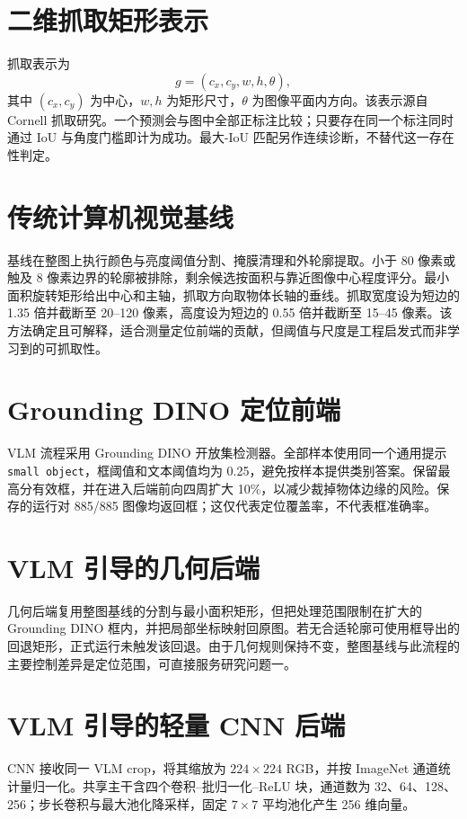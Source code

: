 \documentclass{l4proj}
\begin{document}
\section{二维抓取矩形表示}
抓取表示为
\[
g=(c_x,c_y,w,h,\theta),
\]
其中 $(c_x,c_y)$ 为中心，$w,h$ 为矩形尺寸，$\theta$ 为图像平面内方向。该表示源自 Cornell 抓取研究\citep{jiang2011efficient,lenz2015deep,redmon2015real}。一个预测会与图中全部正标注比较；只要存在同一个标注同时通过 IoU 与角度门槛即计为成功。最大-IoU 匹配另作连续诊断，不替代这一存在性判定。

\section{传统计算机视觉基线}
基线在整图上执行颜色与亮度阈值分割、掩膜清理和外轮廓提取。小于 80 像素或触及 8 像素边界的轮廓被排除，剩余候选按面积与靠近图像中心程度评分。最小面积旋转矩形给出中心和主轴，抓取方向取物体长轴的垂线。抓取宽度设为短边的 1.35 倍并截断至 20--120 像素，高度设为短边的 0.55 倍并截断至 15--45 像素。该方法确定且可解释，适合测量定位前端的贡献，但阈值与尺度是工程启发式而非学习到的可抓取性。

\section{Grounding DINO 定位前端}
VLM 流程采用 Grounding DINO 开放集检测器\citep{liu2023grounding}。全部样本使用同一个通用提示 \texttt{small object}，框阈值和文本阈值均为 0.25，避免按样本提供类别答案。保留最高分有效框，并在进入后端前向四周扩大 10\%，以减少裁掉物体边缘的风险。保存的运行对 885/885 图像均返回框；这仅代表定位覆盖率，不代表框准确率。

\section{VLM 引导的几何后端}
几何后端复用整图基线的分割与最小面积矩形，但把处理范围限制在扩大的 Grounding DINO 框内，并把局部坐标映射回原图。若无合适轮廓可使用框导出的回退矩形，正式运行未触发该回退。由于几何规则保持不变，整图基线与此流程的主要控制差异是定位范围，可直接服务研究问题一。

\section{VLM 引导的轻量 CNN 后端}
CNN 接收同一 VLM crop，将其缩放为 $224\times224$ RGB，并按 ImageNet 通道统计量归一化。共享主干含四个卷积--批归一化--ReLU 块，通道数为 32、64、128、256；步长卷积与最大池化降采样，固定 $7\times7$ 平均池化产生 256 维向量。
\end{document}
